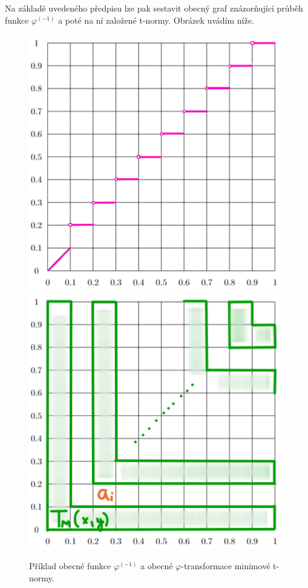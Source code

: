 Na základě uvedeného předpisu lze pak sestavit obecný graf znázor\v nující pr\r uběh funkce $\varphi^{(-1)}$ a poté na ní založené t-normy. Obrázek uvádím níže.


\begin{figure}[H]
\caption{ Příklad obecné funkce $\varphi^{(-1)}$ a obecné $\varphi$-transformace minimové t-normy.\\}
                \centering
        \includegraphics[scale=0.41]{template-fig/basic.pdf}
        \centering
        \includegraphics[scale=0.41]{template-fig/t-norma.pdf}
            \end{figure}


